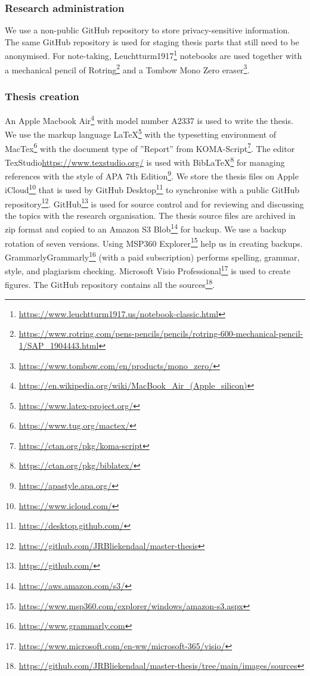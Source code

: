 \subsubsection{Research administration}
\label{sub:tbresearchadministration}
We use a non-public GitHub repository to store privacy-sensitive information. The same GitHub repository is used for staging thesis parts that still need to be anonymised. For note-taking, Leuchtturm1917\footnote{\url{https://www.leuchtturm1917.us/notebook-classic.html}} notebooks are used together with a mechanical pencil of Rotring\footnote{\url{https://www.rotring.com/pens-pencils/pencils/rotring-600-mechanical-pencil-1/SAP_1904443.html}} and a Tombow Mono Zero eraser\footnote{\url{https://www.tombow.com/en/products/mono_zero/}}.
\subsubsection{Thesis creation}
\label{subsub:tbresearchcreation}
An Apple Macbook Air\footnote{\url{https://en.wikipedia.org/wiki/MacBook_Air_(Apple_silicon)}} with model number A2337 is used to write the thesis. We use the markup language \LaTeX\footnote{\url{https://www.latex-project.org/}} with the typesetting environment of MacTex\footnote{\url{https://www.tug.org/mactex/}} with the document type of ''Report'' from KOMA-Script\footnote{\url{https://ctan.org/pkg/koma-script}}. The editor TexStudio{\url{https://www.texstudio.org/}} is used with Bib\LaTeX\footnote{\url{https://ctan.org/pkg/biblatex/}} for managing references with the style of APA 7th Edition\footnote{\url{https://apastyle.apa.org/}}. We store the thesis files on Apple iCloud\footnote{\url{https://www.icloud.com/}} that is used by GitHub Desktop\footnote{\url{https://desktop.github.com/}} to synchronise with a public GitHub repository\footnote{\url{https://github.com/JRBliekendaal/master-thesis}}. GitHub\footnote{\url{https://github.com/}}  is used for source control and for reviewing and discussing the topics with the research organisation. The thesis source files are archived in zip format and copied to an Amazon S3 Blob\footnote{\url{https://aws.amazon.com/s3/}} for backup. We use a backup rotation of seven versions. Using MSP360 Explorer\footnote{\url{https://www.msp360.com/explorer/windows/amazon-s3.aspx}} help us in creating backups. GrammarlyGrammarly\footnote{\url{https://www.grammarly.com}} (with a paid subscription) performs spelling, grammar, style, and plagiarism checking. Microsoft Visio Professional\footnote{\url{https://www.microsoft.com/en-ww/microsoft-365/visio/}} is used to create figures. The GitHub repository contains all the sources\footnote{\url{https://github.com/JRBliekendaal/master-thesis/tree/main/images/sources}}.
